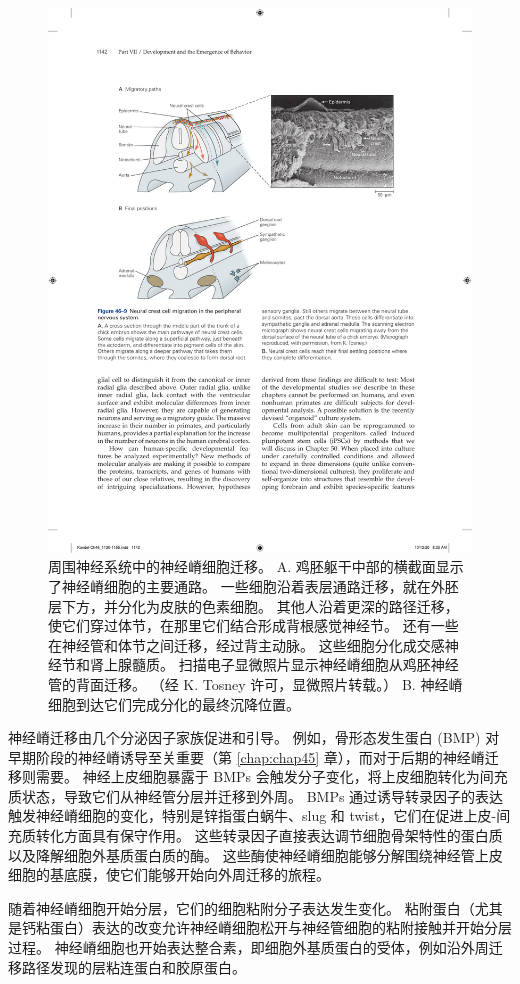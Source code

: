 \begin{figure}[htbp]
	\centering
	\includegraphics[width=0.8\linewidth]{chap46/fig_46_9}
	\caption{周围神经系统中的神经嵴细胞迁移。 A. 鸡胚躯干中部的横截面显示了神经嵴细胞的主要通路。 一些细胞沿着表层通路迁移，就在外胚层下方，并分化为皮肤的色素细胞。 其他人沿着更深的路径迁移，使它们穿过体节，在那里它们结合形成背根感觉神经节。 还有一些在神经管和体节之间迁移，经过背主动脉。 这些细胞分化成交感神经节和肾上腺髓质。 扫描电子显微照片显示神经嵴细胞从鸡胚神经管的背面迁移。 （经 K. Tosney 许可，显微照片转载。） B. 神经嵴细胞到达它们完成分化的最终沉降位置。}
	\label{fig:46_9}
\end{figure}

神经嵴迁移由几个分泌因子家族促进和引导。 例如，骨形态发生蛋白 (BMP) 对早期阶段的神经嵴诱导至关重要（第 \ref{chap:chap45} 章），而对于后期的神经嵴迁移则需要。 神经上皮细胞暴露于 BMPs 会触发分子变化，将上皮细胞转化为间充质状态，导致它们从神经管分层并迁移到外周。 BMPs 通过诱导转录因子的表达触发神经嵴细胞的变化，特别是锌指蛋白蜗牛、slug 和 twist，它们在促进上皮-间充质转化方面具有保守作用。 这些转录因子直接表达调节细胞骨架特性的蛋白质以及降解细胞外基质蛋白质的酶。 这些酶使神经嵴细胞能够分解围绕神经管上皮细胞的基底膜，使它们能够开始向外周迁移的旅程。

随着神经嵴细胞开始分层，它们的细胞粘附分子表达发生变化。 粘附蛋白（尤其是钙粘蛋白）表达的改变允许神经嵴细胞松开与神经管细胞的粘附接触并开始分层过程。 神经嵴细胞也开始表达整合素，即细胞外基质蛋白的受体，例如沿外周迁移路径发现的层粘连蛋白和胶原蛋白。

